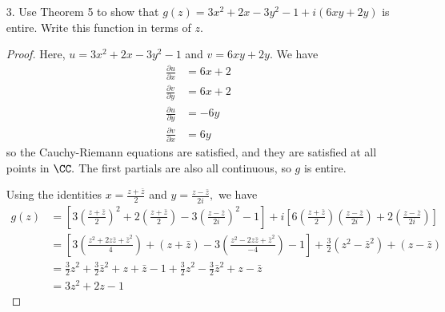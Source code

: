 \documentclass{article}
\begin{document}
\begin{itemize}
	\item[3.] Use Theorem 5 to show that $g(z)=3x^2+2x-3y^2-1+i(6xy+2y)$ is entire. Write this function in terms of $z.$
		\begin{proof}
			Here, $u=3x^2+2x-3y^2-1$ and $v=6xy+2y.$ We have
			\begin{align*}
				\frac{\partial u}{\partial x} &= 6x + 2 \\
				\frac{\partial v}{\partial y} &= 6x + 2 \\
				\frac{\partial u}{\partial y} &= -6y \\
				\frac{\partial v}{\partial x} &= 6y
			\end{align*}
			so the Cauchy-Riemann equations are satisfied, and they are satisfied at all points in $\CC.$ The first partials are also all continuous, so $g$ is entire.

			Using the identities $x=\frac{z+\bar z}{2}$ and $y=\frac{z-\bar z}{2i},$ we have
			\begin{align*}
				g(z) &= \left[ 3\left( \frac{z+\bar z}{2} \right)^2 + 2\left( \frac{z+\bar z}{2} \right) - 3\left( \frac{z-\bar z}{2i} \right)^2 - 1 \right] + i\left[ 6\left( \frac{z+\bar z}{2} \right)\left( \frac{z-\bar z}{2i} \right) + 2\left( \frac{z-\bar z}{2i} \right) \right] \\
				&= \left[ 3\left( \frac{z^2+2z\bar z + \bar z^2}{4} \right) + (z+\bar z) - 3\left( \frac{z^2-2z\bar z+\bar z^2}{-4} \right) - 1 \right] + \frac{3}{2}(z^2-\bar z^2) + (z-\bar z) \\
				&= \frac{3}{2}z^2 + \frac{3}{2}\bar z^2 + z + \bar z - 1 + \frac{3}{2}z^2 - \frac{3}{2}\bar z^2 + z - \bar z \\
				&= 3z^2+2z-1
			\end{align*}
		\end{proof}


\end{itemize}
\end{document}
